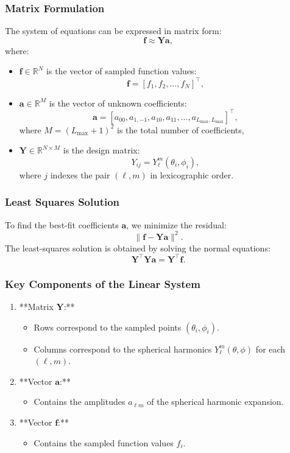 \subsubsection*{Matrix Formulation}
The system of equations can be expressed in matrix form:
\[
\mathbf{f} \approx \mathbf{Y} \mathbf{a},
\]
where:
\begin{itemize}
    \item $\mathbf{f} \in \mathbb{R}^N$ is the vector of sampled function values:
    \[
    \mathbf{f} = [f_1, f_2, \dots, f_N]^\top,
    \]
    \item $\mathbf{a} \in \mathbb{R}^M$ is the vector of unknown coefficients:
    \[
    \mathbf{a} = [a_{00}, a_{1,-1}, a_{10}, a_{11}, \dots, a_{L_{\text{max}},L_{\text{max}}}]^\top,
    \]
    where $M = (L_{\text{max}}+1)^2$ is the total number of coefficients,
    \item $\mathbf{Y} \in \mathbb{R}^{N \times M}$ is the design matrix:
    \[
    Y_{ij} = Y_\ell^m(\theta_i, \phi_i),
    \]
    where $j$ indexes the pair $(\ell, m)$ in lexicographic order.
\end{itemize}

\subsubsection*{Least Squares Solution}
To find the best-fit coefficients $\mathbf{a}$, we minimize the residual:
\[
\|\mathbf{f} - \mathbf{Y} \mathbf{a}\|^2.
\]
The least-squares solution is obtained by solving the normal equations:
\[
\mathbf{Y}^\top \mathbf{Y} \mathbf{a} = \mathbf{Y}^\top \mathbf{f}.
\]

\subsubsection*{Key Components of the Linear System}
\begin{enumerate}
    \item **Matrix $\mathbf{Y}$:**
    \begin{itemize}
        \item Rows correspond to the sampled points $(\theta_i, \phi_i)$.
        \item Columns correspond to the spherical harmonics $Y_\ell^m(\theta, \phi)$ for each $(\ell, m)$.
    \end{itemize}
    \item **Vector $\mathbf{a}$:**
    \begin{itemize}
        \item Contains the amplitudes $a_{\ell m}$ of the spherical harmonic expansion.
    \end{itemize}
    \item **Vector $\mathbf{f}$:**
    \begin{itemize}
        \item Contains the sampled function values $f_i$.
    \end{itemize}
\end{enumerate}

